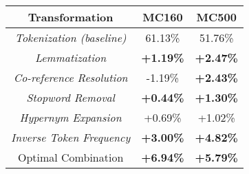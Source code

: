 \begin{tabular}{|c|c|c|}
\hline
\textbf{Transformation} & \textbf{MC160} & \textbf{MC500} \\ \hline
\textit{Tokenization (baseline)} & 61.13\%                 & 51.76\%                 \\ \hline
\textit{Lemmatization}           & \textbf{+1.19\%}                 &\textbf{ +2.47\%}                 \\ \hline
\textit{Co-reference Resolution}             & -1.19\%               &  \textbf{ +2.43\%}                 \\ \hline
\textit{Stopword Removal}        &\textbf{ +0.44\%}               &  \textbf{ +1.30\%}                 \\ \hline
\textit{Hypernym Expansion}        & +0.69\%                 & +1.02\%                 \\ \hline
\textit{Inverse Token Frequency} & \textbf{ +3.00\%}                & \textbf{ +4.82\%}                 \\ \hline \hline
Optimal Combination     & \textbf{+6.94\%}        & \textbf{+5.79\%}        \\ \hline
\end{tabular}
